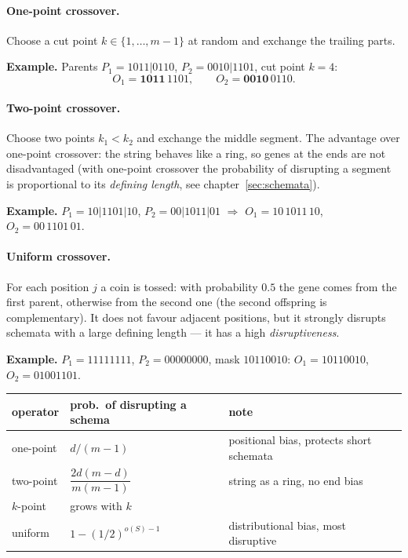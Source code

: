 \documentclass[11pt,a4paper]{article}
\theoremstyle{definition}
\begin{document}
\paragraph{One-point crossover.} Choose a cut point $k \in \{1,\dots,m-1\}$ at
random and exchange the trailing parts.

\textbf{Example.} Parents $P_1 = 1011|0110$, $P_2 = 0010|1101$, cut point $k=4$:
\[
O_1 = \mathbf{1011}\,1101, \qquad O_2 = \mathbf{0010}\,0110.
\]

\paragraph{Two-point crossover.} Choose two points $k_1 < k_2$ and exchange the
middle segment. The advantage over one-point crossover: the string behaves like
a ring, so genes at the ends are not disadvantaged (with one-point crossover the
probability of disrupting a segment is proportional to its \emph{defining
length}, see chapter~\ref{sec:schemata}).

\textbf{Example.} $P_1 = 10|1101|10$, $P_2 = 00|1011|01$ $\Rightarrow$
$O_1 = 10\,1011\,10$, $O_2 = 00\,1101\,01$.

\paragraph{Uniform crossover.} For each position $j$ a coin is tossed: with
probability $0.5$ the gene comes from the first parent, otherwise from the
second one (the second offspring is complementary). It does not favour adjacent
positions, but it strongly disrupts schemata with a large defining length ---
it has a high \emph{disruptiveness}.

\textbf{Example.} $P_1 = 11111111$, $P_2 = 00000000$, mask $10110010$:
$O_1 = 10110010$, $O_2 = 01001101$.

\begin{center}
\begin{tabular}{@{}lll@{}}
\toprule
\textbf{operator} & \textbf{prob.\ of disrupting a schema} & \textbf{note} \\
\midrule
one-point & $d/(m-1)$ & positional bias, protects short schemata \\
two-point & $\dfrac{2d(m-d)}{m(m-1)}$ & string as a ring, no end bias \\
$k$-point & grows with $k$ & \\
uniform & $1 - (1/2)^{o(S)-1}$ & distributional bias, most disruptive \\
\bottomrule
\end{tabular}
\end{center}
\end{document}
